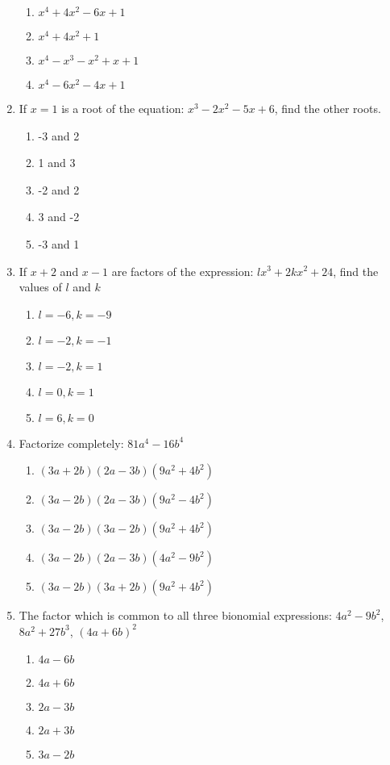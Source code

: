 \begin{multicols}{2}
\begin{enumerate}[label={\arabic*.}]
\begin{enumerate}[label={\Alph*.}]
	\item \(x^4+4{x}^{2}-6x+1\)
	\item \(x^4+4{x}^{2}+1\)
	\item \(x^4-{x}^{3}-{x}^{2}+x+1\)
	\item \(x^4-6{x}^{2}-4x+1\)
	\end{enumerate}
\item If \(x = 1\) is a root of the equation: \({x}^{3}-2{x}^{2}-5x+6\), find the other roots.
	\begin{enumerate}[label={\Alph*.}]
	\item -3 and 2
	\item 1 and 3
	\item -2 and 2
	\item 3 and -2
	\item -3 and 1
	\end{enumerate}
\item If \(x+2\) and \(x-1\) are factors of the expression: \(l{x}^{3}+2k{x}^{2}+24\), find the values of \(l\) and \(k\)
	\begin{enumerate}[label={\Alph*.}]
	\item \(l=-6, k=-9\)
	\item \(l=-2, k=-1\)
	\item \(l=-2, k=1\)
	\item \(l=0, k=1\)
	\item \(l=6, k=0\)
	\end{enumerate}
\item Factorize completely: \(81a^4-16b^4\)
	\begin{enumerate}[label={\Alph*.}]
	\item \((3a+2b)(2a-3b)(9a^2+4b^2)\)
	\item \((3a-2b)(2a-3b)(9a^2-4b^2)\)
	\item \((3a-2b)(3a-2b)(9a^2+4b^2)\)
	\item \((3a-2b)(2a-3b)(4a^2-9b^2)\)
	\item \((3a-2b)(3a+2b)(9a^2+4b^2)\)
	\end{enumerate}
\item The factor which is common to all three bionomial expressions: \(4a^2-9b^2\), \(8a^2+27b^3\), \((4a+6b)^2\)
	\begin{enumerate}[label={\Alph*.}]
	\item \(4a-6b\)
	\item \(4a+6b\)
	\item \(2a-3b\)
	\item \(2a+3b\)
	\item \(3a-2b\)

\end{enumerate}
\end{enumerate}
\end{multicols}
